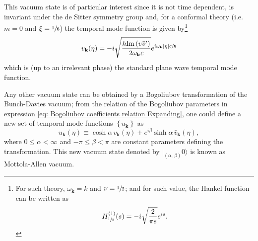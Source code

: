 This vacuum state is of particular interest \cite{VacuumdeSitter} since it is not time dependent, is invariant under the de Sitter symmetry group and, for a conformal theory (i.e. $m=0$ and $\xi=\sfrac{1}{6}$) the temporal mode function is given by\footnote{For such theory, $\omega_\mathbf{k}=k$ and $\nu=\sfrac{1}{2}$; and for such value, the Hankel function can be written as $$H^{(1)}_{\sfrac{1}{2}}(s)=-i\sqrt{\frac{2}{\pi s}}e^{is}.$$}
\begin{equation}
	v_\mathbf{k}(\eta)=-i\sqrt{\frac{\hbar\text{Im}\left( v\bar{v}'\right)}{ 2\omega_\mathbf{k}c}}e^{i\omega_\mathbf{k}|\eta|c\sfrac{}{\hbar}}
\end{equation}
which is (up to an irrelevant phase) the standard plane wave temporal mode function.

Any other vacuum state can be obtained by a Bogoliubov transformation of the Bunch-Davies vacuum; from the relation of the Bogoliubov parameters in expression \ref{eq: Bogoliubov coefficients relation Expanding}, one could define a new set of temporal mode functions $\left\{u_\mathbf{k}\right\}$ as
\begin{equation}
	u_\mathbf{k}(\eta)\equiv \cosh\alpha \,v_\mathbf{k}(\eta)+e^{i\beta}\sinh\alpha \,\bar{v}_\mathbf{k}(\eta),
\end{equation}
where $0\leq \alpha<\infty$ and $-\pi\leq\beta<\pi$ are constant parameters defining the transformation. This new vacuum state denoted by $|_{(\alpha,\,\beta)}0\rangle$ is known as Mottola-Allen vacuum.

